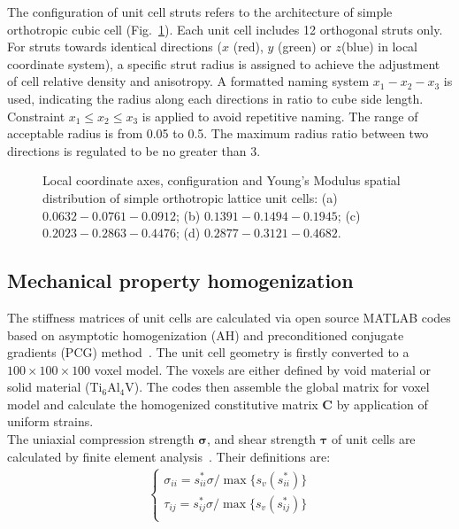 \documentclass[12pt]{extbook}
\begin{document}
The configuration of unit cell struts refers to the architecture of simple orthotropic cubic cell (Fig.~\ref{prototype}). Each unit cell includes 12 orthogonal struts only. For struts towards identical directions ($x$ (red), $y$ (green) or $z$(blue) in local coordinate system), a specific strut radius is assigned to achieve the adjustment of cell relative density and anisotropy. A formatted naming system $x_1-x_2-x_3$ is used, indicating the radius along each directions in ratio to cube side length. Constraint $x_1 \leq x_2 \leq x_3$ is applied to avoid repetitive naming. The range of acceptable radius is from 0.05 to 0.5. The maximum radius ratio between two directions is regulated to be no greater than 3.\\

\begin{figure}[htbp]
\centering
{}
\caption{Local coordinate axes, configuration and Young's Modulus spatial distribution of simple orthotropic lattice unit cells: (a) $0.0632-0.0761-0.0912$; (b) $0.1391-0.1494-0.1945$; (c) $0.2023-0.2863-0.4476$; (d) $0.2877-0.3121-0.4682$.}
\label{prototype}
\end{figure}

\subsection{Mechanical property homogenization}

The stiffness matrices of unit cells are calculated via open source MATLAB codes based on asymptotic homogenization (AH) and preconditioned conjugate gradients (PCG) method~\cite{dong2019149}. The unit cell geometry is firstly converted to a $100\times 100 \times 100$ voxel model. The voxels are either defined by void material or solid material ($\text{Ti}_6\text{Al}_4\text{V}$). The codes then assemble the global matrix for voxel model and calculate the homogenized constitutive matrix $\bm{C}$ by application of uniform strains.\\

The uniaxial compression strength $\bm{\sigma}$, and shear strength $\bm{\tau}$ of unit cells are calculated by finite element analysis~\cite{arabnejad2013mechanical}. Their definitions are:
\begin{equation}
\begin{split}
\left\{
\begin{array}{l}
{\sigma}_{ii} = s^*_{ii}{\sigma} / \max{\{s_v(s^*_{ii})\}}\\
{\tau}_{ij} = s^*_{ij}{\sigma} / \max{\{s_v(s^*_{ij})\}}\\
\end{array}
\right.
\end{split}
\label{2-2-1}
\end{equation}
\end{document}
